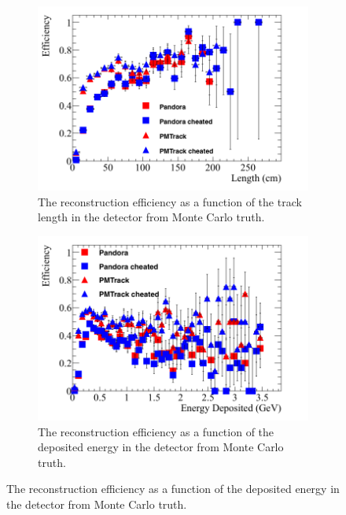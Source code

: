 \begin{figure}
  \centering
  \begin{subfigure}{0.48\textwidth}
        \centering
        \includegraphics[width=\textwidth]{Effic_ProtonEnrich_500V_Proton_Length}
        \caption{The reconstruction efficiency as a function of the track length in the detector from Monte Carlo truth.}
        \label{fig:Prot_Effic_Len}
  \end{subfigure}%
  \hspace{0.03\textwidth}%
  \begin{subfigure}{0.48\textwidth}
        \centering
        \includegraphics[width=\textwidth]{Effic_ProtonEnrich_500V_Proton_EnDepos}
        \caption{The reconstruction efficiency as a function of the deposited energy in the detector from Monte Carlo truth.}
        \label{fig:Prot_Effic_EnDepos}
  \end{subfigure}

\end{figure}
